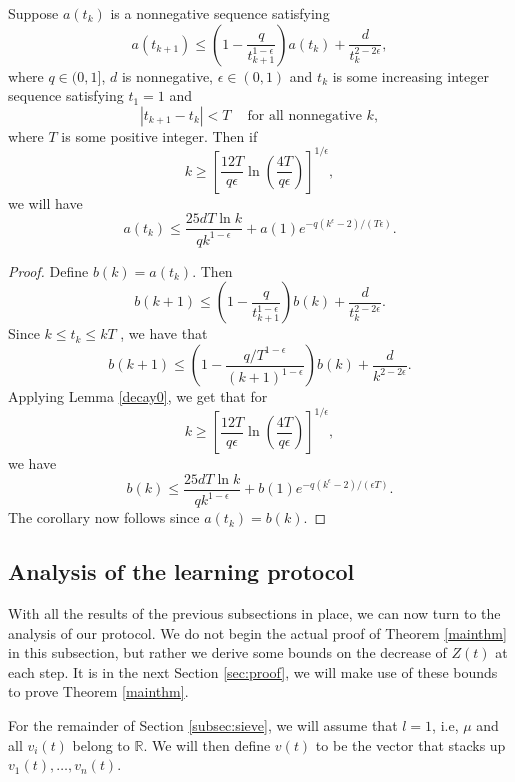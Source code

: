 \documentclass[final]{siamltex}
\begin{document}
\smallskip

\begin{corollary} Suppose $a(t_k)$ is a nonnegative sequence satisfying \[ a(t_{k+1}) \leq \left( 1 - \frac{q}{t_{k+1}^{1-\epsilon}} \right) a(t_k) + \frac{d}{t_k^{2 - 2 \epsilon}},\] where $q \in (0,1]$, $d$ is nonnegative, $\epsilon \in (0,1)$ and $t_k$ is some increasing integer sequence satisfying $t_1=1$ and 
\[ |t_{k+1} - t_k | < T ~~~~ \mbox{ for all nonnegative } k, \] where $T$ is some positive integer.  
Then if 
\[ k \geq \left[ \frac{12T}{q \epsilon} \ln \left( \frac{4T}{q \epsilon} \right) \right]^{1/\epsilon} ,\] we will have 
\[ a(t_k) \leq \frac{25dT \ln k}{q k^{1 -  \epsilon}}  + a(1) e^{-q(k^\epsilon - 2)/(T\epsilon)} .\]\label{effdecay}
\end{corollary} 

\begin{proof} Define $b(k) = a(t_k)$. Then 
\[ b(k+1) \leq \left( 1 - \frac{q}{t_{k+1}^{1-\epsilon}} \right) b(k) + \frac{d}{t_k^{2 - 2 \epsilon}}. \] Since $  k \leq t_k \leq kT$ , we have that 
\[ b(k+1) \leq \left( 1 - \frac{q/T^{1-\epsilon}}{(k+1)^{1-\epsilon}} \right) b(k) + \frac{d}{k^{2 - 2 \epsilon}}. \] Applying Lemma \ref{decay0}, we get
that for 
\[ k \geq  \left[ \frac{12T}{q \epsilon} \ln \left( \frac{4T}{q\epsilon} \right) \right]^{1/\epsilon},\] we have 
\begin{equation} \label{tkeq} b(k) \leq \frac{25dT \ln k }{qk^{1-\epsilon}} + b(1) e^{-q(k^{\epsilon}-2)/(\epsilon T)}. \end{equation} 
The corollary now follows since $a(t_k)=b(k)$. 
\end{proof}

 
\subsection{Analysis of the learning protocol\label{subsec:sieve}}

With all the results of the previous subsections in place, we can now turn to the analysis of our protocol. We do not begin the actual proof of Theorem \ref{mainthm} in this subsection, but rather we derive some bounds on the decrease of $Z(t)$ at each step. It is in the next Section \ref{sec:proof}, we will make use of these bounds to prove Theorem \ref{mainthm}. 

 For the remainder of Section \ref{subsec:sieve},
we will assume that $l=1$, i.e,  $\mu$ and all $v_i(t)$ belong to ${\mathbb{R}}$. We will then define $v(t)$ to be the vector that stacks up $v_1(t), \ldots, v_n(t)$. 
\end{document}
